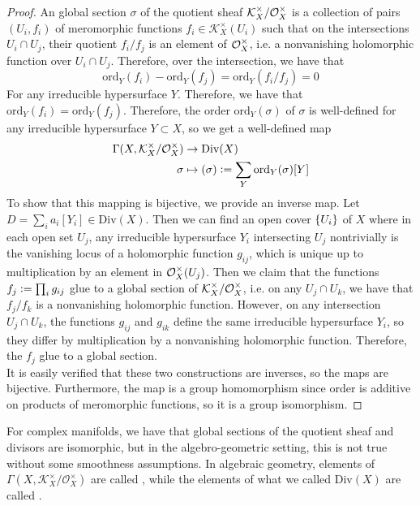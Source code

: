 %
\begin{proof}
An global section $\sigma$ of the quotient sheaf $\mathcal{K}_X^\times / \mathcal{O}_X^\times$ is a
collection of pairs $(U_i, f_i)$ of meromorphic functions
$f_i \in \mathcal{K}_X^\times(U_i)$ such that on the intersections $U_i \cap U_j$, their
quotient  $f_i/f_j$ is an element of $\mathcal{O}_X^\times$, i.e. a nonvanishing holomorphic
function over $U_i \cap U_j$. Therefore, over the intersection, we have that
\[
\mathrm{ord}_Y(f_i) - \mathrm{ord}_Y(f_j) = \mathrm{ord}_Y(f_i/f_j) = 0
\]
For any irreducible hypersurface $Y$. Therefore, we have that
$\mathrm{ord}_Y(f_i) = \mathrm{ord}_Y(f_j)$. Therefore, the order
$\mathrm{ord}_Y(\sigma)$ of $\sigma$ is well-defined for any irreducible hypersurface
$Y \subset X$, so we get a well-defined map
\begin{align*}
\Gamma(X, \mathcal{K}^\times_X / \mathcal{O}_X^\times) &\to \mathrm{Div}(X) \\
\sigma &\mapsto (\sigma) \vcentcolon= \sum_Y \mathrm{ord}_Y(\sigma)[Y]
\end{align*}
To show that this mapping is bijective, we provide an inverse map. Let
$D = \sum_i a_i [Y_i] \in \mathrm{Div}(X)$. Then we can find an open cover $\left\lbrace U_i \right\rbrace$
of $X$ where in each open set $U_j$, any irreducible hypersurface $Y_i$ intersecting
$U_j$ nontrivially is the vanishing locus of a holomorphic function $g_{ij}$, which
is unique up to multiplication by an element in $\mathcal{O}_X^\times(U_j)$. Then we claim that
the functions $f_j \vcentcolon= \prod_i g_{ij}$ glue to a global section of
$\mathcal{K}_X^\times / \mathcal{O}_X^\times$, i.e. on any $U_j \cap U_k$, we have that
$f_j/f_k$ is a nonvanishing holomorphic function. However, on any intersection
$U_j \cap U_k$, the functions $g_{ij}$ and $g_{ik}$ define the same irreducible
hypersurface $Y_i$, so they differ by multiplication by a nonvanishing holomorphic
function. Therefore, the $f_j$ glue to a global section. \\

It is easily verified that these two constructions are inverses, so the maps
are bijective. Furthermore, the map is a group homomorphism since order is
additive on products of meromorphic functions, so it is a group isomorphism.
\end{proof}
%
\begin{rem*}
For complex manifolds, we have that global sections of the quotient sheaf and divisors
are isomorphic, but in the algebro-geometric setting, this is not true without some
smoothness assumptions. In algebraic geometry, elements of
$\Gamma(X, \mathcal{K}_X^\times/\mathcal{O}_X^\times)$ are called ,
while the elements of what we called $\mathrm{Div}(X)$ are called .
\end{rem*}
